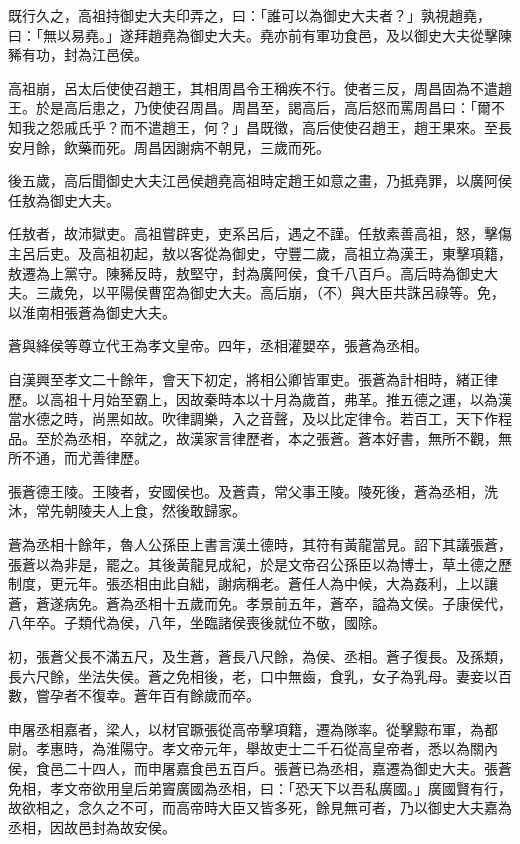 \begin{pinyinscope}
既行久之，高祖持御史大夫印弄之，曰：「誰可以為御史大夫者？」孰視趙堯，曰：「無以易堯。」遂拜趙堯為御史大夫。堯亦前有軍功食邑，及以御史大夫從擊陳豨有功，封為江邑侯。

高祖崩，呂太后使使召趙王，其相周昌令王稱疾不行。使者三反，周昌固為不遣趙王。於是高后患之，乃使使召周昌。周昌至，謁高后，高后怒而罵周昌曰：「爾不知我之怨戚氏乎？而不遣趙王，何？」昌既徵，高后使使召趙王，趙王果來。至長安月餘，飲藥而死。周昌因謝病不朝見，三歲而死。

後五歲，高后聞御史大夫江邑侯趙堯高祖時定趙王如意之畫，乃抵堯罪，以廣阿侯任敖為御史大夫。

任敖者，故沛獄吏。高祖嘗辟吏，吏系呂后，遇之不謹。任敖素善高祖，怒，擊傷主呂后吏。及高祖初起，敖以客從為御史，守豐二歲，高祖立為漢王，東擊項籍，敖遷為上黨守。陳豨反時，敖堅守，封為廣阿侯，食千八百戶。高后時為御史大夫。三歲免，以平陽侯曹窋為御史大夫。高后崩，（不）與大臣共誅呂祿等。免，以淮南相張蒼為御史大夫。

蒼與絳侯等尊立代王為孝文皇帝。四年，丞相灌嬰卒，張蒼為丞相。

自漢興至孝文二十餘年，會天下初定，將相公卿皆軍吏。張蒼為計相時，緒正律歷。以高祖十月始至霸上，因故秦時本以十月為歲首，弗革。推五德之運，以為漢當水德之時，尚黑如故。吹律調樂，入之音聲，及以比定律令。若百工，天下作程品。至於為丞相，卒就之，故漢家言律歷者，本之張蒼。蒼本好書，無所不觀，無所不通，而尤善律歷。

張蒼德王陵。王陵者，安國侯也。及蒼貴，常父事王陵。陵死後，蒼為丞相，洗沐，常先朝陵夫人上食，然後敢歸家。

蒼為丞相十餘年，魯人公孫臣上書言漢土德時，其符有黃龍當見。詔下其議張蒼，張蒼以為非是，罷之。其後黃龍見成紀，於是文帝召公孫臣以為博士，草土德之歷制度，更元年。張丞相由此自絀，謝病稱老。蒼任人為中候，大為姦利，上以讓蒼，蒼遂病免。蒼為丞相十五歲而免。孝景前五年，蒼卒，謚為文侯。子康侯代，八年卒。子類代為侯，八年，坐臨諸侯喪後就位不敬，國除。

初，張蒼父長不滿五尺，及生蒼，蒼長八尺餘，為侯、丞相。蒼子復長。及孫類，長六尺餘，坐法失侯。蒼之免相後，老，口中無齒，食乳，女子為乳母。妻妾以百數，嘗孕者不復幸。蒼年百有餘歲而卒。

申屠丞相嘉者，梁人，以材官蹶張從高帝擊項籍，遷為隊率。從擊黥布軍，為都尉。孝惠時，為淮陽守。孝文帝元年，舉故吏士二千石從高皇帝者，悉以為關內侯，食邑二十四人，而申屠嘉食邑五百戶。張蒼已為丞相，嘉遷為御史大夫。張蒼免相，孝文帝欲用皇后弟竇廣國為丞相，曰：「恐天下以吾私廣國。」廣國賢有行，故欲相之，念久之不可，而高帝時大臣又皆多死，餘見無可者，乃以御史大夫嘉為丞相，因故邑封為故安侯。


\end{pinyinscope}
